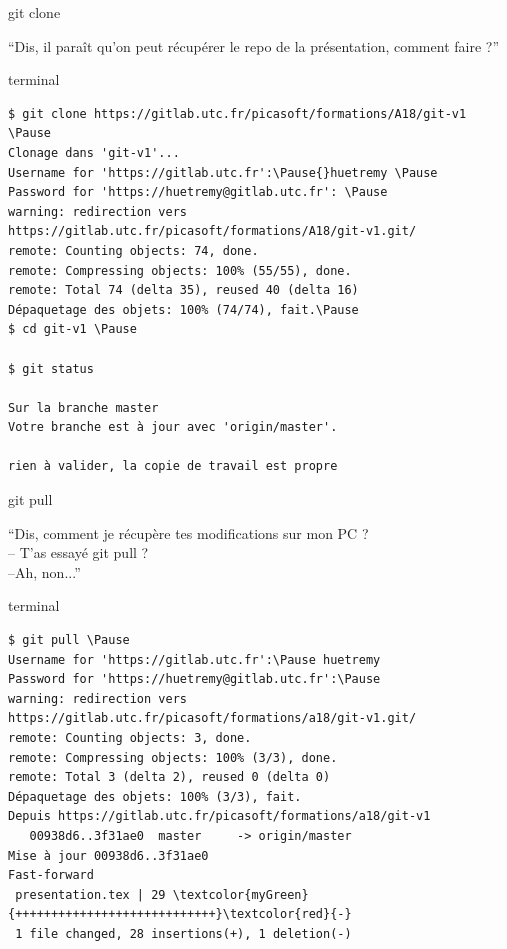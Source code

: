 \documentclass[usepdftitle=false]{beamer}
\def\seplength{.3\topsep}
\newcommand{\Pause}{%
\ifdef{\Release}
  {\pause}
  {}
}
\begin{document}
\begin{frame}[fragile]{git clone}
	\begin{block}{}
	\enquote{Dis, il paraît qu'on peut récupérer le repo de la présentation, comment faire ?}
	\end{block}
	\begin{beamercolorbox}[rounded=true,shadow=true]{terminal}
		\vspace{-\seplength}
\begin{Verbatim}
$ git clone https://gitlab.utc.fr/picasoft/formations/A18/git-v1 \Pause
Clonage dans 'git-v1'...
Username for 'https://gitlab.utc.fr':\Pause{}huetremy \Pause
Password for 'https://huetremy@gitlab.utc.fr': \Pause
warning: redirection vers https://gitlab.utc.fr/picasoft/formations/A18/git-v1.git/
remote: Counting objects: 74, done.
remote: Compressing objects: 100% (55/55), done.
remote: Total 74 (delta 35), reused 40 (delta 16)
Dépaquetage des objets: 100% (74/74), fait.\Pause
$ cd git-v1 \Pause

$ git status

Sur la branche master
Votre branche est à jour avec 'origin/master'.

rien à valider, la copie de travail est propre
		\end{Verbatim}
	\end{beamercolorbox}
\end{frame}

\begin{frame}[fragile]{git pull}
	\begin{block}{}
		\enquote{Dis, comment je récupère tes modifications sur mon PC ? \\ -- T'as essayé git pull ? \\ --Ah, non...}
	\end{block}
	\begin{beamercolorbox}[rounded=true,shadow=true]{terminal}
		\vspace{-\seplength}
	\begin{Verbatim}
$ git pull \Pause
Username for 'https://gitlab.utc.fr':\Pause huetremy
Password for 'https://huetremy@gitlab.utc.fr':\Pause
warning: redirection vers https://gitlab.utc.fr/picasoft/formations/a18/git-v1.git/
remote: Counting objects: 3, done.
remote: Compressing objects: 100% (3/3), done.
remote: Total 3 (delta 2), reused 0 (delta 0)
Dépaquetage des objets: 100% (3/3), fait.
Depuis https://gitlab.utc.fr/picasoft/formations/a18/git-v1
   00938d6..3f31ae0  master     -> origin/master
Mise à jour 00938d6..3f31ae0
Fast-forward
 presentation.tex | 29 \textcolor{myGreen}{++++++++++++++++++++++++++++}\textcolor{red}{-}
 1 file changed, 28 insertions(+), 1 deletion(-)
	\end{Verbatim}
	\end{beamercolorbox}
\end{frame}
\end{document}
